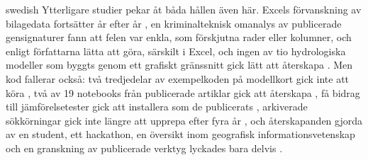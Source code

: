 \begin{onlyin}{swedish}
Ytterligare studier pekar åt båda hållen även här.  Excels förvanskning
av bilagedata fortsätter år efter år \autocite{DeRijk2018Opentsv}, en
kriminalteknisk omanalys av publicerade gensignaturer fann att felen var
enkla, som förskjutna rader eller kolumner, och enligt författarna lätta
att göra, särskilt i Excel\autocite[avsnitt~7.1]{Baggerly2009Deriving},
och ingen av tio
hydrologiska modeller som byggts genom ett grafiskt gränssnitt gick lätt
att återskapa \autocite{Chawanda2020User}.  Men kod fallerar också: två
tredjedelar av exempelkoden på modellkort gick inte att köra
\autocite{Yao2026Understanding}, två av 19 notebooks från publicerade
artiklar gick att återskapa \autocite{Kashiwa2026Study}, få bidrag till
jämförelsetester gick att installera som de publicerats
\autocite{Lyu2026Code}, arkiverade sökkörningar gick inte längre att
upprepa efter fyra år \autocite{Lin2020Reproducibility}, och
återskapanden gjorda av en student, ett hackathon, en översikt inom
geografisk informationsvetenskap och en granskning av publicerade
verktyg lyckades bara delvis \autocite{Oneka2018Evaluating,%
Willems2026Insights,Nust2022Infrastructures,Nong2023Open}.
\end{onlyin}

